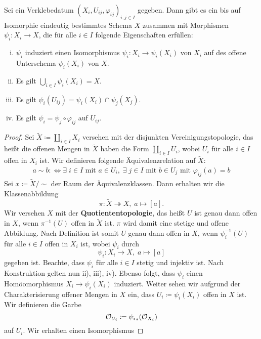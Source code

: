 \begin{lem}
\label{lem:5.10}
	Sei ein Verklebedatum $(X_i,U_{ij},\varphi_{ij})_{i,j\in I}$ gegeben. Dann gibt es ein bis auf Isomorphie eindeutig bestimmtes Schema $X$ zusammen mit Morphismen $\psi_i \colon X_i \to X$, die für alle $i \in I$ folgende Eigenschaften erfüllen:
	\begin{enumerate}[i)]
		\item $\psi_i$ induziert einen Isomorphismus $\psi_i \colon X_i \to \psi_i(X_i)$ von $X_i$ auf des offene Unterschema $\psi_i(X_i)$ von $X$.
		\item Es gilt $\bigcup_{i \in I} \psi_i(X_i) = X$.
		\item Es gilt $\psi_i(U_{ij}) = \psi_i(X_i) \cap \psi_j(X_j)$.
		\item Es gilt $\psi_i = \psi_j \circ \varphi_{ij}$ auf $U_{ij}$.
	\end{enumerate}
	\begin{proof}
		Sei $\widetilde{X} \coloneqq \coprod_{i\in I}X_i$ versehen mit der disjunkten Vereinigungstopologie, das heißt die offenen Mengen in $\widetilde{X}$ haben die Form $\coprod_{i\in I} U_i$, wobei $U_i$ für alle $i \in I$ offen in $X_i$ ist. Wir definieren folgende Äquivalenzrelation auf $\widetilde{X}$:
		\begin{align*}
			a \sim b \colon\Longleftrightarrow \exists \;i \in I \text{ mit } a \in U_i,\; \exists \;j \in I \text{ mit } b \in U_j \text{ mit } \varphi_{ij}(a) = b
		\end{align*}
		Sei $x \coloneqq \widetilde{X}/\sim$ der Raum der Äquivalenzklassen. Dann erhalten wir die Klassenabbildung
		\[
			\pi\colon \widetilde{X} \twoheadrightarrow X,\; a \mapsto [a].
		\]
		Wir versehen $X$ mit der \textbf{Quotiententopologie}, das heißt $U$ ist genau dann offen in $X$, wenn $\pi^{-1}(U)$ offen in $\widetilde{X}$ ist. $\pi$ wird damit eine stetige und offene Abbildung. Nach Definition ist somit $U$ genau dann offen in $X$, wenn $\psi_i^{-1}(U)$ für alle $i \in I$ offen in $X_i$ ist, wobei $\psi_i$ durch
		\[
			\psi_i\colon X_i \to X,\; a \mapsto [a]
		\]
		gegeben ist. Beachte, dass $\psi_i$ für alle $i \in I$ stetig und injektiv ist. Nach Konstruktion gelten nun ii), iii), iv). Ebenso folgt, dass $\psi_i$ einen Homöomorphismus $X_i \to \psi_i(X_i)$ induziert. Weiter sehen wir aufgrund der Charakterisierung offener Mengen in $X$ ein, dass $U_i\coloneqq \psi_i(X_i)$ offen in $X$ ist. Wir definieren die Garbe
		\[
			\mathcal{O}_{U_i} \coloneqq {\psi_i}_*(\mathcal{O}_{X_i})
		\]
		auf $U_i$. Wir erhalten einen Isomorphismus

\end{proof}
\end{lem}
